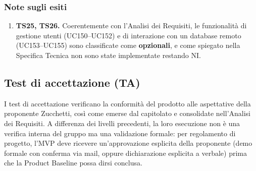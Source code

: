 \vspace{0.2cm}
\subsubsection*{Note sugli esiti}
\begin{enumerate}
    \item[(1)] \textbf{TS25, TS26.} Coerentemente con l'Analisi dei Requisiti, le funzionalità di gestione utenti (UC150--UC152) e di interazione con un database remoto (UC153--UC155) sono classificate come \textbf{opzionali}, e come spiegato nella Specifica Tecnica non sono state implementate restando NI.
\end{enumerate}

\subsection{Test di accettazione (TA)}
\label{sec:test-accettazione}
I test di accettazione verificano la conformità del prodotto alle aspettative della proponente Zucchetti, così come emerse dal capitolato e consolidate nell'Analisi dei Requisiti. A differenza dei livelli precedenti, la loro esecuzione non è una verifica interna del gruppo ma una validazione formale: per regolamento di progetto, l'MVP deve ricevere un'approvazione esplicita della proponente (demo formale con conferma via mail, oppure dichiarazione esplicita a verbale) prima che la Product Baseline possa dirsi conclusa. 

